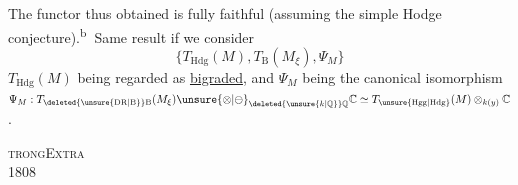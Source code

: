 The functor  thus obtained is fully faithful (assuming the simple Hodge conjecture).\textsuperscript{\textcircled{b}} Same result if we consider
\[
\bigl\{T_{\mathrm{Hdg}}(M),T_{\mathrm B}(M_\xi),\Psi_M\bigr\}
\]
$T_{\mathrm{Hdg}}(M)$ being regarded as \uline{bigraded}, and $\Psi_M$ being the canonical isomorphism $\Psi_M:T_{\deleted{\unsure{\mathrm{DR}|\mathrm B}}\mathrm B}(M_\xi)\unsure{\otimes|\ominus}_{\deleted{\unsure{k|\mathbb Q}}\mathbb Q}\mathbb C\simeq T_{\unsure{\mathrm{Hgg}|\mathrm{Hdg}}}(M)\otimes_{k(y)}\mathbb C$.
\par\noindent\textsc{trong}\hfill\textsc{Extra}\\
 1808\hfill{}
